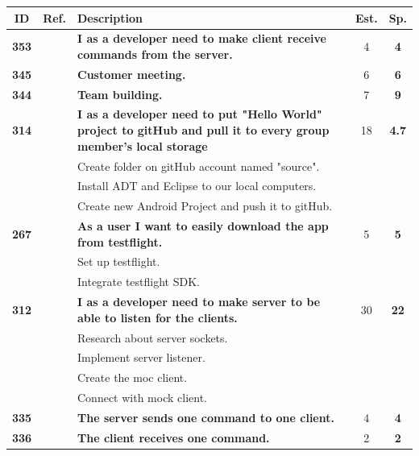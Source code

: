 \begin{longtable}
\caption{User stories selected for Sprint 1.}
\label{tab:sprint1stories}
\def\arraystretch{1.25}
\begin{tabularx}{\textwidth}{ccXcc} 
\toprule[1mm]
\textbf{ID} 	&
\textbf{Ref.}   &
 \textbf{Description} 									& \textbf{Est.} & \textbf{Sp.} \\
\hline
\textbf{353} 	&& {\bf I as a developer need to make client receive commands from the server.} 	& 	4		& \textbf{4} \\

\textbf{345} 	&& {\bf Customer meeting.} 	& 		6	& \textbf{6} \\

\textbf{344} 	&& {\bf Team building.} 	& 		7	& \textbf{9} \\
				
\textbf{314} 	&& {\bf I as a developer need to put "Hello World" project to gitHub and pull it to every group member's local storage} 	& 	18	& \textbf{ 4.7} \\
				&& Create folder on gitHub account named "source".	&  &  \\
				&& Install ADT and Eclipse to our local computers. 	&  &  \\
				&& Create new Android Project and push it to gitHub. 	&  &  \\
				
\textbf{267} 	&& {\bf As a user I want to easily download the app from testflight. } 	& 		5	& \textbf{5} \\
				&& Set up testflight.	&  &  \\
				&& Integrate testflight SDK. &  &  \\
				
\textbf{312} 	&& {\bf I as a developer need to make server to be able to listen for the clients.} 	& 	30	& \textbf{22} \\
				&& Research about server sockets.	&  &  \\
				&& Implement server listener.	&  &  \\
				&& Create the moc client. &  &  \\
				&& Connect with mock client. &  &  \\
				
\textbf{335} 	&& {\bf The server sends one command to one client. } 	& 		4	& \textbf{4} \\

\textbf{336} 	&& {\bf The client receives one command. } 	& 	2	& \textbf{2} \\


\end{tabularx}
\end{longtable}
